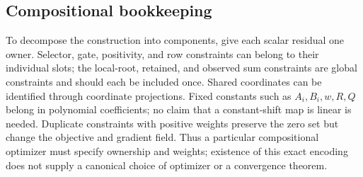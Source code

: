 \subsection{Compositional bookkeeping}
To decompose the construction into components, give each scalar residual
one owner. Selector, gate, positivity, and row constraints can belong to
their individual slots; the local-root, retained, and observed sum
constraints are global constraints and should each be included once.
Shared coordinates can be identified through coordinate projections.
Fixed constants such as $A_i,B_i,w,R,Q$ belong in polynomial coefficients;
no claim that a constant-shift map is linear is needed. Duplicate
constraints with positive weights preserve the zero set but change the
objective and gradient field. Thus a particular compositional optimizer
must specify ownership and weights; existence of this exact encoding does
not supply a canonical choice of optimizer or a convergence theorem.
